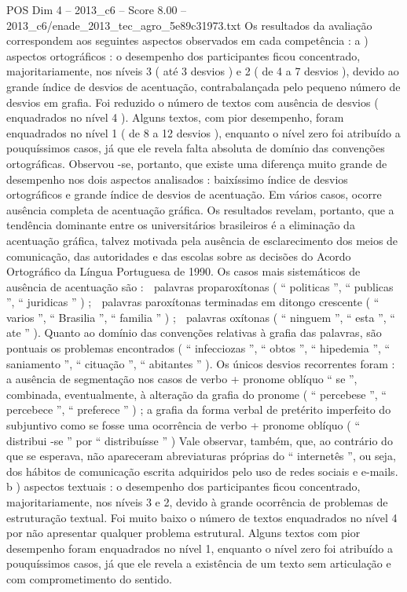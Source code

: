 \begin{textsample}{POS Dim 4 – 2013\_c6 – Score 8.00 – 2013\_c6/enade\_2013\_tec\_agro\_5e89c31973.txt}
Os resultados da avaliação correspondem aos seguintes aspectos observados em cada competência : a ) aspectos ortográficos : o desempenho dos participantes ficou concentrado, majoritariamente, nos níveis 3 ( até 3 desvios ) e 2 ( de 4 a 7 desvios ), devido ao grande índice de desvios de acentuação, contrabalançada pelo pequeno número de desvios em grafia.
Foi reduzido o número de textos com ausência de desvios ( enquadrados no nível 4 ).
Alguns textos, com pior desempenho, foram enquadrados no nível 1 ( de 8 a 12 desvios ), enquanto o nível zero foi atribuído a pouquíssimos casos, já que ele revela falta absoluta de domínio das convenções ortográficas.
Observou -se, portanto, que existe uma diferença muito grande de desempenho nos dois aspectos analisados : baixíssimo índice de desvios ortográficos e grande índice de desvios de acentuação.
Em vários casos, ocorre ausência completa de acentuação gráfica.
Os resultados revelam, portanto, que a tendência dominante entre os universitários brasileiros é a eliminação da acentuação gráfica, talvez motivada pela ausência de esclarecimento dos meios de comunicação, das autoridades e das escolas sobre as decisões do Acordo Ortográfico da Língua Portuguesa de 1990.
Os casos mais sistemáticos de ausência de acentuação são :  palavras proparoxítonas ( “ politicas ”, “ publicas ”, “ juridicas ” ) ;  palavras paroxítonas terminadas em ditongo crescente ( “ varios ”, “ Brasilia ”, “ familia ” ) ;  palavras oxítonas ( “ ninguem ”, “ esta ”, “ ate ” ).
Quanto ao domínio das convenções relativas à grafia das palavras, são pontuais os problemas encontrados ( “ infecciozas ”, “ obtos ”, “ hipedemia ”, “ saniamento ”, “ cituação ”, “ abitantes ” ).
Os únicos desvios recorrentes foram : a ausência de segmentação nos casos de verbo + pronome oblíquo “ se ”, combinada, eventualmente, à alteração da grafia do pronome ( “ percebese ”, “ percebece ”, “ preferece ” ) ; a grafia da forma verbal de pretérito imperfeito do subjuntivo como se fosse uma ocorrência de verbo + pronome oblíquo ( “ distribui -se ” por “ distribuísse ” ) Vale observar, também, que, ao contrário do que se esperava, não apareceram abreviaturas próprias do “ internetês ”, ou seja, dos hábitos de comunicação escrita adquiridos pelo uso de redes sociais e e-mails. b ) aspectos textuais : o desempenho dos participantes ficou concentrado, majoritariamente, nos níveis 3 e 2, devido à grande ocorrência de problemas de estruturação textual.
Foi muito baixo o número de textos enquadrados no nível 4 por não apresentar qualquer problema estrutural.
Alguns textos com pior desempenho foram enquadrados no nível 1, enquanto o nível zero foi atribuído a pouquíssimos casos, já que ele revela a existência de um texto sem articulação e com comprometimento do sentido.

\end{textsample}
